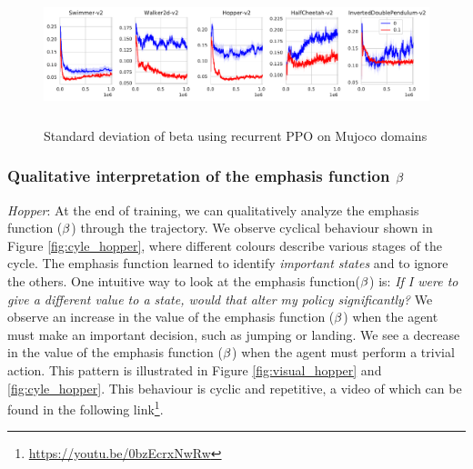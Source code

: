 \begin{figure}[h]
    \centering
    \includegraphics[width=\textwidth, height=4cm]{fig/beta_std.pdf}
    \caption{Standard deviation of beta using recurrent PPO on Mujoco domains}
    \label{fig:beta_std}
\end{figure}

\subsubsection{Qualitative interpretation of the emphasis function $\beta$ }
\emph{Hopper}: At the end of training, we can qualitatively analyze the emphasis function ($\beta$) through the trajectory. We observe cyclical behaviour shown in Figure \ref{fig:cyle_hopper}, where different colours describe various stages of the cycle. The emphasis function learned to identify \emph{important states} and to ignore the others. One intuitive way to look at the emphasis function($\beta$) is: \emph{If I were to give a different value to a state, would that alter my policy significantly?} We observe an increase in the value of the emphasis function ($\beta$) when the agent must make an important decision, such as jumping or landing. We see a decrease in the value of the emphasis function ($\beta$) when the agent must perform a trivial action. This pattern is illustrated in Figure \ref{fig:visual_hopper} and \ref{fig:cyle_hopper}. This behaviour is cyclic and repetitive, a video of which can be found in the following link\footnote{\url{https://youtu.be/0bzEcrxNwRw}{}}.
